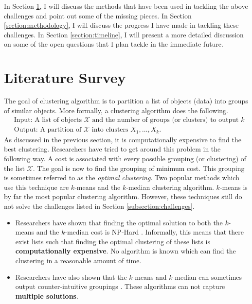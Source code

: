 \documentclass[11pt]{article}
\newcommand{\mc}{\mathcal}
\begin{document}
In Section \ref{section:literaturesurvey}, I will discuss the methods that have been used in tackling the above challenges and point out some of the missing pieces. In Section \ref{section:methodology}, I will discuss the progress I have made in tackling these challenges. In Section \ref{section:timeline}, I will present a more detailed discussion on some of the open questions that I plan tackle in the immediate future.

\section{Literature Survey}
\label{section:literaturesurvey}
The goal of clustering algorithm is to partition a list of objects (data) into groups of similar objects. More formally, a clustering algorithm does the following.
\begin{align*}
&\text{Input: A list of objects }\mc X\text{ and the number of groups (or clusters) to output }k\\
&\text{Output: A partition of }\mc X\text{ into clusters }X_1, \ldots, X_k.
\end{align*}
As discussed in the previous section, it is computationally expensive to find the best clustering. Researchers have tried to get around this problem in the following way. A cost is associated with every possible grouping (or clustering) of the list $\mc X$. The goal is now to find the grouping of minimum cost. This grouping is sometimes referred to as the \textit{optimal clustering}. Two popular methods which use this technique are $k$-means \cite{macqueen1967some} and the $k$-median \cite{jain1988algorithms} clustering algorithm. $k$-means is by far the most popular clustering algorithm. However, these techniques still do not solve the challenges listed in Section \ref{subsection:challenges}. 
\begin{itemize}
\item Researchers have shown that finding the optimal solution to both the $k$-means and the $k$-median cost is NP-Hard \cite{dasgupta2008hardness}.  Informally, this means that there exist lists such that finding the optimal clustering of these lists is \textbf{computationally expensive}.  No algorithm is known which can find the clustering in a reasonable amount of time. 
\item Researchers have also shown that the $k$-means and $k$-median can sometimes output counter-intuitive groupings \cite{mirkes2011k}. These algorithms can not capture \textbf{multiple solutions}.
\end{itemize}
\end{document}
